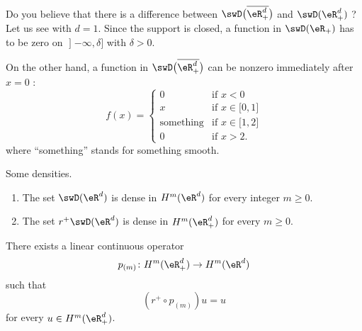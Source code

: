 \begin{normaltext}
Do you believe that there is a difference between \( \swD\big( \overline{ \eR^d_+ }\big)\) and \( \swD(\eR^d_+)\) ? Let us see with \( d=1\). Since the support is closed, a function in \( \swD(\eR_+)\) has to be zero on \( \mathopen] -\infty , \delta \mathclose]\) with \( \delta>0\).

On the other hand, a function in \( \swD\big( \overline{ \eR^d_+ } \big)\) can be nonzero immediately after \( x=0\) :
\begin{equation}
    f(x)=\begin{cases}
        0    &   \text{if } x<0\\
        x    &    \text{if  } x\in\mathopen[ 0 , 1 \mathclose]\\
        \text{something}    &    \text{if } x\in \mathopen[ 1 , 2 \mathclose]\\
        0    &   \text{if } x>2.
    \end{cases}
\end{equation}
where ``something'' stands for something smooth.
\end{normaltext}

\begin{proposition}      \label{PROPooCXYRooPTgSLX}
    Some densities.
    \begin{enumerate}
        \item
            The set \( \swD(\eR^d)\) is dense in \( H^m(\eR^d)\) for every integer \( m\geq 0\).
        \item
            The set \( r^+\swD(\eR^d)\) is dense in \( H^m(\eR^d_+)\) for every \( m\geq 0\).
    \end{enumerate}
\end{proposition}

\begin{theorem}
    There exists a linear continuous operator
    \begin{equation}
        p_{(m)}\colon H^m(\eR^d_+)\to H^m(\eR^d)
    \end{equation}
    such that
    \begin{equation}
        (r^+\circ p_{(m)})u=u
    \end{equation}
    for every \( u\in H^m(\eR^d_+)\).
\end{theorem}

